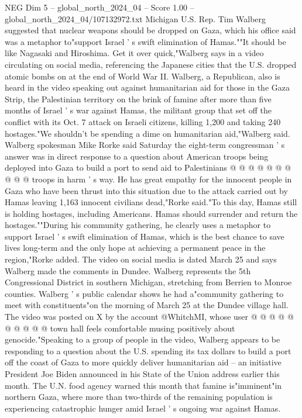 \begin{textsample}{NEG Dim 5 – global\_north\_2024\_04 – Score 1.00 – global\_north\_2024\_04/107132972.txt}  \label{ex:f5_neg_170}
Michigan U.S.
Rep.
Tim Walberg suggested that nuclear weapons should be dropped on Gaza, which his office said was a metaphor to"support Israel ' s swift elimination of Hamas.""It should be like Nagasaki and Hiroshima.
Get it over quick,"Walberg says in a video circulating on social media, referencing the Japanese cities that the U.S. dropped atomic bombs on at the end of World War II.
Walberg, a Republican, also is heard in the video speaking out against humanitarian aid for those in the Gaza Strip, the Palestinian territory on the brink of famine after more than five months of Israel ' s war against Hamas, the militant group that set off the conflict with its Oct. 7 attack on Israeli citizens, killing 1,200 and taking 240 hostages."We shouldn't be spending a dime on humanitarian aid,"Walberg said.
Walberg spokesman Mike Rorke said Saturday the eight-term congressman ' s answer was in direct response to a question about American troops being deployed into Gaza to build a port to send aid to Palestinians @ @ @ @ @ @ @ @ @ @ troops in harm ' s way.
He has great empathy for the innocent people in Gaza who have been thrust into this situation due to the attack carried out by Hamas leaving 1,163 innocent civilians dead,"Rorke said."To this day, Hamas still is holding hostages, including Americans.
Hamas should surrender and return the hostages.""During his community gathering, he clearly uses a metaphor to support Israel ' s swift elimination of Hamas, which is the best chance to save lives long-term and the only hope at achieving a permanent peace in the region,"Rorke added.
The video on social media is dated March 25 and says Walberg made the comments in Dundee.
Walberg represents the 5th Congressional District in southern Michigan, stretching from Berrien to Monroe counties.
Walberg ' s public calendar shows he had a"community gathering to meet with constituents"on the morning of March 25 at the Dundee village hall.
The video was posted on X by the account @WhitchMI, whose user @ @ @ @ @ @ @ @ @ @ town hall feels comfortable musing positively about genocide."Speaking to a group of people in the video, Walberg appears to be responding to a question about the U.S. spending its tax dollars to build a port off the coast of Gaza to more quickly deliver humanitarian aid -- an initiative President Joe Biden announced in his State of the Union address earlier this month.
The U.N. food agency warned this month that famine is"imminent"in northern Gaza, where more than two-thirds of the remaining population is experiencing catastrophic hunger amid Israel ' s ongoing war against Hamas.

\end{textsample}

